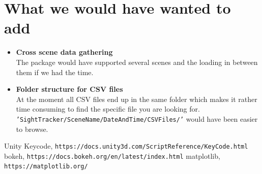 \documentclass[letterpaper]{article}
\begin{document}
\section{What we would have wanted to add}
\begin{itemize}
\item \textbf{Cross scene data gathering}\\
The package would have supported several scenes and the loading in between them if we had the time.
\item \textbf{Folder structure for CSV files}\\
At the moment all CSV files end up in the same folder which makes it rather time consuming to find the specific file you are looking for.\\
\texttt{'SightTracker/SceneName/DateAndTime/CSVFiles/'} would have been easier to browse.
\end{itemize}
\newpage
\begin{thebibliography}{9}
Unity Keycode,
\texttt{https://docs.unity3d.com/ScriptReference/KeyCode.html}
bokeh, 
\texttt{https://docs.bokeh.org/en/latest/index.html}
matplotlib,
\texttt{https://matplotlib.org/}

\end{thebibliography}
\end{document}
